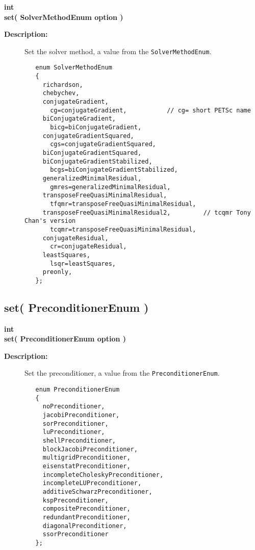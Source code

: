 \begin{flushleft} \textbf{%
int  \\ 
\settowidth{\OgesParametersIncludeArgIndent}{set(}%
set( SolverMethodEnum option )
}\end{flushleft}
\begin{description}
\item[{\bf Description:}] 
   Set the solver method, a value from the {\tt SolverMethodEnum}.
 \begin{verbatim}
   enum SolverMethodEnum
   {
     richardson,
     chebychev,
     conjugateGradient,
       cg=conjugateGradient,           // cg= short PETSc name
     biConjugateGradient,
       bicg=biConjugateGradient,
     conjugateGradientSquared,
       cgs=conjugateGradientSquared,
     biConjugateGradientSquared,    
     biConjugateGradientStabilized,    
       bcgs=biConjugateGradientStabilized,
     generalizedMinimalResidual,
       gmres=generalizedMinimalResidual,
     transposeFreeQuasiMinimalResidual, 
       tfqmr=transposeFreeQuasiMinimalResidual,
     transposeFreeQuasiMinimalResidual2,         // tcqmr Tony Chan's version
       tcqmr=transposeFreeQuasiMinimalResidual,
     conjugateResidual,
       cr=conjugateResidual,
     leastSquares,
       lsqr=leastSquares,
     preonly,
   };
 \end{verbatim}
\end{description}
\subsection{set( PreconditionerEnum )}
 
\begin{flushleft} \textbf{%
int  \\ 
\settowidth{\OgesParametersIncludeArgIndent}{set(}%
set( PreconditionerEnum option )
}\end{flushleft}
\begin{description}
\item[{\bf Description:}] 
   Set the preconditioner, a value from the {\tt PreconditionerEnum}.
 \begin{verbatim}
   enum PreconditionerEnum
   {
     noPreconditioner,
     jacobiPreconditioner,
     sorPreconditioner,
     luPreconditioner,
     shellPreconditioner,
     blockJacobiPreconditioner,
     multigridPreconditioner,
     eisenstatPreconditioner,
     incompleteCholeskyPreconditioner,
     incompleteLUPreconditioner,
     additiveSchwarzPreconditioner,
     kspPreconditioner,
     compositePreconditioner,
     redundantPreconditioner,
     diagonalPreconditioner,
     ssorPreconditioner
   };
 \end{verbatim}
\end{description}
